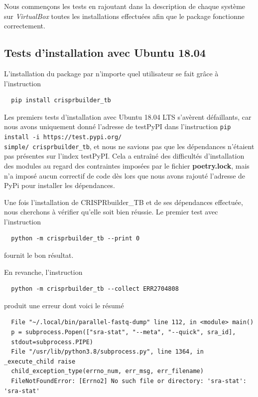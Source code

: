 \documentclass[twoside,a4paper,11pt,frenchb,openany]{report}
\begin{document}
Nous commençons les tests en rajoutant dans la description de chaque système sur \textit{VirtualBox} toutes les installations effectuées afin que le package fonctionne correctement.





\subsection{Tests d'installation avec Ubuntu 18.04}

L’installation du package par n'importe quel utilisateur se fait grâce à l’instruction
\begin{verbatim}  pip install crisprbuilder_tb\end{verbatim}

Les premiers tests d'installation avec Ubuntu 18.04 LTS s'avèrent défaillants, car nous avons uniquement donné l'adresse de testPyPI dans l'instruction \texttt{pip install -i https://test.pypi.org/\\simple/ crisprbuilder\_tb}, et nous ne savions pas que les dépendances n'étaient pas présentes sur l'index testPyPI. Cela a entraîné des difficultés d'installation des modules au regard des contraintes imposées par le fichier \textbf{poetry.lock}, mais n'a imposé aucun correctif de code dès lors que nous avons rajouté l'adresse de PyPi pour installer les dépendances.

Une fois l'installation de CRISPRbuilder\_TB et de ses dépendances effectuée, nous cherchons à vérifier qu'elle soit bien réussie. Le premier test avec l'instruction

\begin{verbatim}
  python -m crisprbuilder_tb --print 0
\end{verbatim}

fournit le bon résultat.

En revanche, l'instruction

\begin{verbatim}
  python -m crisprbuilder_tb --collect ERR2704808
\end{verbatim}

produit une erreur dont voici le résumé

\begin{verbatim}
  File "~/.local/bin/parallel-fastq-dump" line 112, in <module> main()
  p = subprocess.Popen(["sra-stat", "--meta", "--quick", sra_id], 
  stdout=subprocess.PIPE)
  File "/usr/lib/python3.8/subprocess.py", line 1364, in _execute_child raise 
  child_exception_type(errno_num, err_msg, err_filename)
  FileNotFoundError: [Errno2] No such file or directory: 'sra-stat': 'sra-stat'
\end{verbatim}
\end{document}
